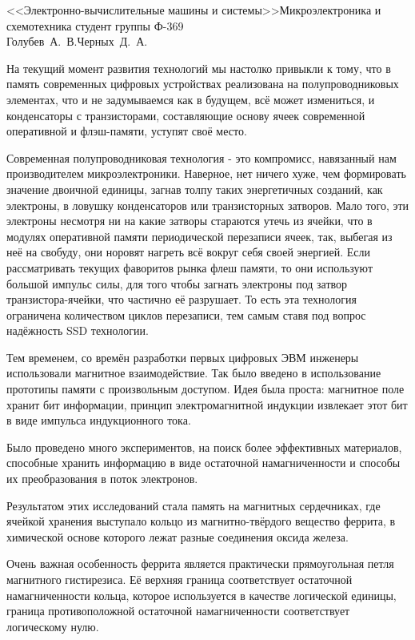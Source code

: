 




{<<Электронно-вычислительные машины и системы>>}{Микроэлектроника и схемотехника}
{студент группы Ф-369\\Голубев~А.~В.}{Черных~Д.~А.}{}

На текущий момент развития технологий мы настолко привыкли к тому, что в 
память современных цифровых устройствах реализована на полупроводниковых 
элементах, что и не задумываемся как в будущем, всё может измениться, и 
конденсаторы с транзисторами, составляющие основу ячеек современной 
оперативной и флэш-памяти, уступят своё место. 

Современная полупроводниковая технология - это компромисс, навязанный нам 
производителем микроэлектроники. Наверное, нет ничего хуже, чем формировать 
значение двоичной единицы, загнав толпу таких энергетичных созданий, как 
электроны, в ловушку конденсаторов или транзисторных затворов. Мало того, 
эти электроны несмотря ни на какие затворы стараются утечь из ячейки, что 
в модулях оперативной памяти периодической перезаписи ячеек, так, выбегая 
из неё на свобуду, они норовят нагреть всё вокруг себя своей энергией. 
Если рассматривать текущих фаворитов рынка флеш памяти, то они используют 
большой импульс силы, для того чтобы загнать электроны под затвор 
транзистора-ячейки, что частично её разрушает. То есть эта технология 
ограничена количеством циклов перезаписи, тем самым ставя под вопрос 
надёжность SSD технологии.

Тем временем, со времён разработки первых цифровых ЭВМ инженеры 
использовали магнитное взаимодействие. Так было введено в использование 
прототипы памяти с произвольным доступом. Идея была проста: магнитное поле 
хранит бит информации, принцип электромагнитной индукции извлекает этот 
бит в виде импульса индукционного тока. 

Было проведено много экспериментов, на поиск более эффективных 
материалов, способные хранить информацию в виде остаточной намагниченности 
и способы их преобразования в поток электронов.

Результатом этих исследований стала память на магнитных сердечниках, где 
ячейкой хранения выступало кольцо из магнитно-твёрдого вещество феррита, в 
химической основе которого лежат разные соединения оксида железа.

Очень важная особенность феррита является практически прямоугольная 
петля магнитного гистирезиса. Её верхняя граница соответствует остаточной 
намагниченности кольца, которое используется в качестве логической 
единицы, граница противоположной остаточной намагниченности соответствует 
логическому нулю. 

